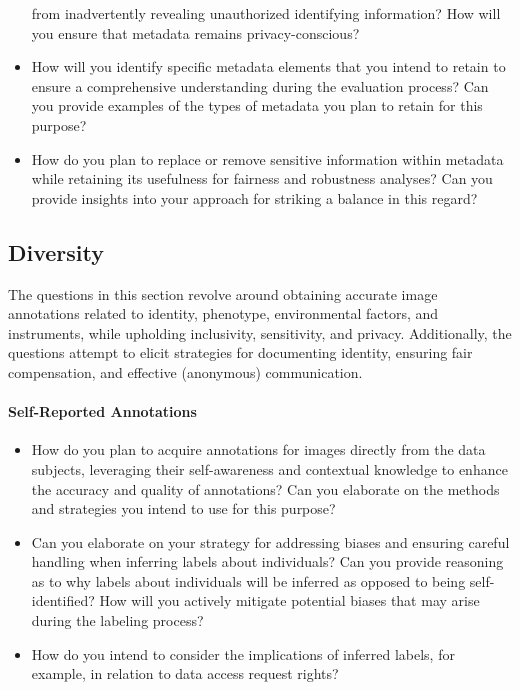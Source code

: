 \begin{itemize}
    from inadvertently revealing unauthorized identifying information? How will you
    ensure that metadata remains privacy-conscious?
    \item How will you identify specific metadata elements that you intend to retain
    to ensure a comprehensive understanding during the evaluation process? Can you
    provide examples of the types of metadata you plan to retain for this purpose?
    \item How do you plan to replace or remove sensitive information within metadata
    while retaining its usefulness for fairness and robustness analyses? Can you
    provide insights into your approach for striking a balance in this regard?
\end{itemize}

\subsection{Diversity}
The questions in this section revolve around obtaining accurate image annotations
related to identity, phenotype, environmental factors, and instruments, while upholding
inclusivity, sensitivity, and privacy. Additionally, the questions attempt to elicit
strategies for documenting identity, ensuring fair compensation, and effective
(anonymous) communication.

\paragraph{Self-Reported Annotations}
\begin{itemize}
    \item How do you plan to acquire annotations for images directly from the data
    subjects, leveraging their self-awareness and contextual knowledge to enhance the
    accuracy and quality of annotations? Can you elaborate on the methods and
    strategies you intend to use for this purpose?
    \item Can you elaborate on your strategy for addressing biases and ensuring careful
    handling when inferring labels about individuals? Can you provide reasoning as to
    why labels about individuals will be inferred as opposed to being self-identified?
    How will you actively mitigate potential biases that may arise during the labeling
    process?
    \item How do you intend to consider the implications of inferred labels, for
    example, in relation to data access request rights?
\end{itemize}

